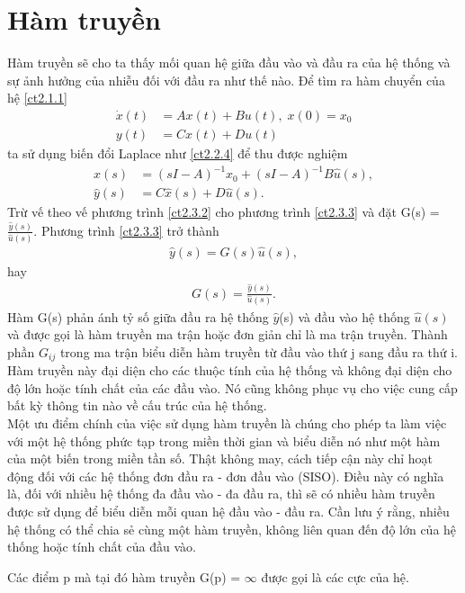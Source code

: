 \section{Hàm truyền}
Hàm truyền sẽ cho ta thấy mối quan hệ giữa đầu vào và đầu ra của hệ thống và sự ảnh hưởng của nhiễu đối với đầu ra như thế nào.
Để tìm ra hàm chuyển của hệ \eqref{ct2.1.1}
\begin{align}
    \dot{x}(t) &= Ax(t) + Bu(t), \; x(0) = x_0 \label{ct2.3.1} \\ 
    y(t) &= Cx(t) + Du(t) \nonumber
\end{align}
ta sử dụng biến đổi Laplace như \eqref{ct2.2.4} để thu được nghiệm
\begin{align}
    \hat{x}(s) &= (sI - A)^{-1} x_0 + (sI - A)^{-1} B \hat{u}(s), \label{ct2.3.2}\\
    \hat{y}(s) &= C\hat{x}(s) + D\hat{u}(s). \label{ct2.3.3}
\end{align}
Trừ vế theo vế phương trình \eqref{ct2.3.2} cho phương trình \eqref{ct2.3.3} và đặt G(s) = $\frac{\hat{y}(s)}{\hat{u}(s)}$. Phương trình \eqref{ct2.3.3} trở thành 
\begin{align}
    \hat{y}(s) = G(s)\hat{u}(s), \nonumber
\end{align}
hay 
\begin{align}
    G(s) = \frac{\hat{y}(s)}{\hat{u}(s)}.
\end{align}
Hàm G(s) phản ánh tỷ số giữa đầu ra hệ thống $\hat{y}$(s) và đầu vào hệ thống $\hat{u}(s)$ và được gọi là hàm truyền ma trận hoặc đơn giản chỉ là ma trận truyền. Thành phần $G_{ij}$ trong ma trận biểu diễn hàm truyền từ đầu vào thứ j sang đầu ra thứ i. Hàm truyền này đại diện cho các thuộc tính của hệ thống và không đại diện cho độ lớn hoặc tính chất của các đầu vào. Nó cũng không phục vụ cho việc cung cấp bất kỳ thông tin nào về cấu trúc của hệ thống.\\
Một ưu điểm chính của việc sử dụng hàm truyền là chúng cho phép ta làm việc với một hệ thống phức tạp trong miền thời gian và biểu diễn nó như một hàm của một biến trong miền tần số. Thật không may, cách tiếp cận này chỉ hoạt động đối với các hệ thống đơn đầu ra - đơn đầu vào (SISO). Điều này có nghĩa là, đối với nhiều hệ thống đa đầu vào - đa đầu ra, thì sẽ có nhiều hàm truyền được sử dụng để biểu diễn mỗi quan hệ đầu vào - đầu ra. Cần lưu ý rằng, nhiều hệ thống có thể chia sẻ cùng một hàm truyền, không liên quan đến độ lớn của hệ thống hoặc tính chất của đầu vào.
\begin{definition}
Các điểm p mà tại đó hàm truyền G(p) = $\infty$ được gọi là các cực của hệ.
\end{definition}
